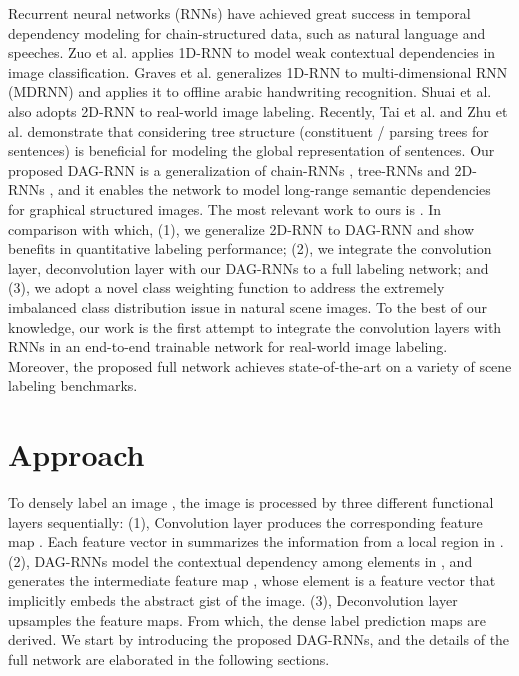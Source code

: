 \documentclass[10pt,twocolumn,letterpaper]{article}
\begin{document}
Recurrent neural networks (RNNs) have achieved great success in temporal dependency modeling for chain-structured data, such as natural language and speeches.
Zuo et al. \cite{zuo2015convolutional} applies 1D-RNN to model weak contextual dependencies in image classification.
Graves et al. \cite{graves2012offline} generalizes 1D-RNN to multi-dimensional RNN (MDRNN) and applies it to offline arabic handwriting recognition. Shuai et al.\cite{shuai2015quaddirectional} also adopts 2D-RNN to real-world image labeling. Recently, Tai et al.\cite{tai2015improved} and Zhu et al.\cite{zhu2015long} demonstrate that considering tree structure (constituent / parsing trees for sentences) is beneficial for modeling the global representation of sentences. Our proposed DAG-RNN is a generalization of chain-RNNs \cite{bengio2013advances}\cite{irsoy2014opinion}, tree-RNNs \cite{tai2015improved}\cite{zhu2015long} and 2D-RNNs \cite{graves2012offline}\cite{shuai2015quaddirectional}, and  it enables the network to model long-range semantic dependencies for graphical structured images. The most relevant work to ours is \cite{shuai2015quaddirectional}. In comparison with which, (1), we generalize 2D-RNN to DAG-RNN and show benefits in quantitative labeling performance; (2), we integrate the convolution layer, deconvolution layer with our DAG-RNNs to a full labeling network; and (3), we adopt a novel class weighting function to address the extremely imbalanced class distribution issue in natural scene images. To the best of our knowledge, our work is the first attempt to integrate the convolution layers with RNNs in an end-to-end trainable network for real-world image labeling.
Moreover, the proposed full network achieves state-of-the-art on a variety of scene labeling benchmarks.





\label{Section:related_work}
\section{Approach}
\label{Section:approach}


To densely label an image , the image is processed by three different functional layers sequentially: (1), Convolution layer produces the corresponding feature map . Each feature vector in  summarizes the information from a local region in . (2), DAG-RNNs model the contextual dependency among elements in , and generates the intermediate feature map , whose element is a feature vector that implicitly embeds the abstract gist of the image. (3), Deconvolution layer \cite{long2015fully} upsamples the feature maps. From which, the dense label prediction maps are derived. We start by introducing the proposed DAG-RNNs, and the details of the full network are elaborated in the following sections.
\end{document}
